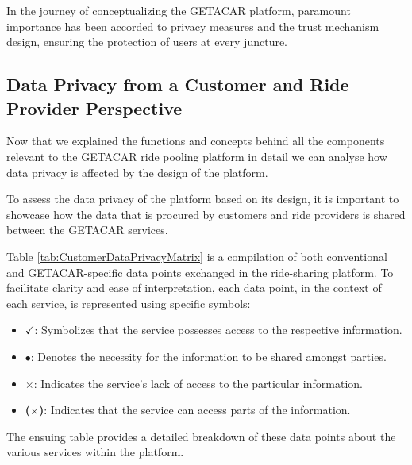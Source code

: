 In the journey of conceptualizing the GETACAR platform, paramount importance has been accorded to privacy measures and the trust mechanism design, ensuring the protection of users  at every juncture. 

\subsection{Data Privacy from a Customer and Ride Provider Perspective}
Now that we explained the functions and concepts behind all the components relevant to the GETACAR ride pooling platform in detail we can analyse how data privacy is  affected by the design of the platform.

To assess the data privacy of the platform based on its design, it is important to showcase how the data that is procured by customers and ride providers is shared between the GETACAR services.

Table \ref{tab:CustomerDataPrivacyMatrix} is a compilation of both conventional and GETACAR-specific data points  exchanged in the ride-sharing platform.
To facilitate clarity and ease of interpretation, each data point, in the context of each service, is represented using specific symbols:

\begin{itemize}
    \item \textbf{$\checkmark$}: Symbolizes that the service possesses access to the respective information.
    \item \textbf{$\bullet$}: Denotes the necessity for the information to be shared amongst parties.
    \item \textbf{$\times$}: Indicates the service's lack of access to the particular information.
    \item \textbf{($\times$)}: Indicates that the service can access parts of the information.
\end{itemize}

The ensuing table provides a detailed breakdown of these data points about the various services within the platform.


